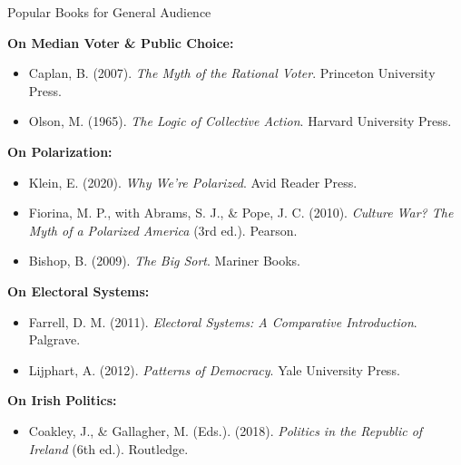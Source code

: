 \documentclass[10pt]{beamer}
\begin{document}
\begin{frame}{Popular Books for General Audience}
\footnotesize

\textbf{On Median Voter \& Public Choice:}
\begin{itemize}
\item Caplan, B. (2007). \emph{The Myth of the Rational Voter}. Princeton University Press.
\item Olson, M. (1965). \emph{The Logic of Collective Action}. Harvard University Press.
\end{itemize}


\textbf{On Polarization:}
\begin{itemize}
\item Klein, E. (2020). \emph{Why We're Polarized}. Avid Reader Press.
\item Fiorina, M. P., with Abrams, S. J., \& Pope, J. C. (2010). \emph{Culture War? The Myth of a Polarized America} (3rd ed.). Pearson.
\item Bishop, B. (2009). \emph{The Big Sort}. Mariner Books.
\end{itemize}


\textbf{On Electoral Systems:}
\begin{itemize}
\item Farrell, D. M. (2011). \emph{Electoral Systems: A Comparative Introduction}. Palgrave.
\item Lijphart, A. (2012). \emph{Patterns of Democracy}. Yale University Press.
\end{itemize}


\textbf{On Irish Politics:}
\begin{itemize}
\item Coakley, J., \& Gallagher, M. (Eds.). (2018). \emph{Politics in the Republic of Ireland} (6th ed.). Routledge.
\end{itemize}
\end{frame}
\end{document}
